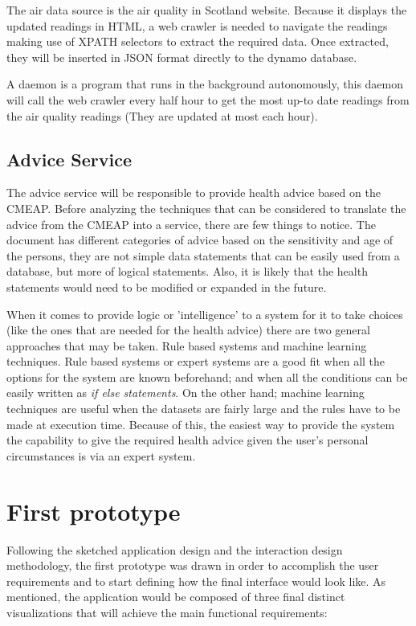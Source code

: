  The air data source is the air quality in Scotland website. Because it displays the updated readings in HTML, a web crawler is needed to navigate the readings making use of XPATH selectors to extract the required data. Once extracted, they will be inserted in JSON format directly to the dynamo database.
 
A daemon is a program that runs in the background autonomously, this daemon will call the web crawler every half hour to get the most up-to date readings from the air quality readings (They are updated at most each hour). 

\subsection{Advice Service}
The advice service will be responsible to provide health advice based on the CMEAP\cite{HealthProtectionAgencyfortheCommitteeontheMedicalEffectsofAirPollutants2011}. Before analyzing the techniques that can be considered to translate the advice from the CMEAP into a service, there are few things to notice. The document has different categories of advice based on the sensitivity and age of the persons, they are not simple data statements that can be easily used from a database, but more of logical statements. Also, it is likely that the health statements would need to be modified or expanded in the future. 

When it comes to provide logic or 'intelligence' to a system for it to take choices (like the ones that are needed for the health advice) there are two general approaches that may be taken. Rule based systems and machine learning techniques. Rule based systems or expert systems are a good fit when all the options for the system are known beforehand; and when all the conditions can be easily written as \textit{if else statements}. On the other hand; machine learning techniques are useful when the datasets are fairly large and the rules have to be made at execution time. Because of this, the easiest way to provide the system the capability to give the required health advice given the user's personal circumstances is via an expert system.

\section{First prototype}
Following the sketched application design and the interaction design methodology, the first prototype was drawn in order to accomplish the user requirements and to start defining how the final interface would look like. As mentioned, the application would be composed of three final distinct visualizations that will achieve the main functional requirements:

